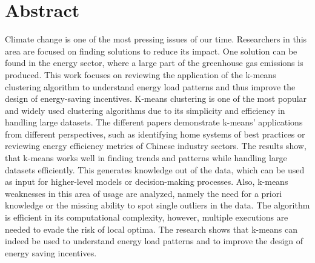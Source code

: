 \chapter{Abstract}
\label{cha:abstract}
Climate change is one of the most pressing issues of our time. 
Researchers in this area are focused on finding solutions to reduce its impact.
One solution can be found in the energy sector, where a large part of the greenhouse gas emissions is produced.
This work focuses on reviewing the application of the k-means clustering algorithm to understand energy load patterns and thus improve the design of energy-saving incentives.
K-means clustering is one of the most popular and widely used clustering algorithms due to its simplicity and efficiency in handling large datasets.
The different papers demonstrate k-means' applications from different perspectives, such as identifying home systems of best practices or reviewing energy efficiency metrics of Chinese industry sectors.
The results show, that k-means works well in finding trends and patterns while handling large datasets efficiently.
This generates knowledge out of the data, which can be used as input for higher-level models or decision-making processes.
Also, k-means weaknesses in this area of usage are analyzed, namely the need for a priori knowledge or the missing ability to spot single outliers in the data.
The algorithm is efficient in its computational complexity, however, multiple executions are needed to evade the risk of local optima.
The research shows that k-means can indeed be used to understand energy load patterns and to improve the design of energy saving incentives.